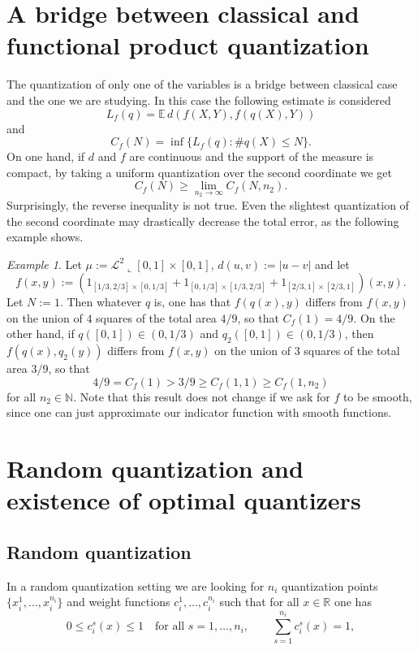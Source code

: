 \documentclass{amsart}
\theoremstyle{remark}
\newtheorem{example}[theorem]{Example}
\numberwithin{equation}{section}
\numberwithin{figure}{section}
\newcommand{\R}{\mathbb{R}}
\newcommand{\N}{\mathbb{N}}
\def\E{\mathbb{E}\,}
\newcommand{\res}{\llcorner}
\begin{document}
\section{A bridge between classical and functional product quantization}
The quantization of only one of the variables is a bridge between classical case and the one we are studying. In this case the following estimate is considered
\[
L_f(q) = \E d(f(X, Y), f(q(X), Y))
\]
and
\[
C_f(N) = \inf \{L_f(q): \#q(X) \leq N\}.
\]
On one hand, if $d$ and $f$ are continuous and the support of the measure is compact, by taking a uniform quantization over the second coordinate we get
\[
C_f(N) \geq \lim_{n_2 \to \infty} C_f(N, n_2).
\]
Surprisingly, the reverse inequality is not true. Even the slightest quantization of the second coordinate may drastically decrease the total error, as the following example shows.

\begin{example}
Let $\mu:=\mathcal{L}^2\res [0, 1] \times [0, 1]$, $d(u,v):=|u-v|$ %
and let
\[
f(x, y) := (1_{[1/3, 2/3]\times [0, 1/3]} + 1_{[0, 1/3]\times [1/3, 2/3]} + 1_{[2/3, 1]\times [2/3, 1]}) (x, y).
\]
Let $N := 1$. Then whatever $q$ is, one has that $f(q(x), y)$ differs from $f(x, y)$ on the union of $4$ squares of the total
area $4/9$, so that $C_f(1)=4/9$. On the other hand, if $q([0,1])\in (0,1/3)$ and $q_2([0,1])\in (0,1/3)$, then $f(q(x), q_2(y))$ differs from $f(x, y)$ on the union of $3$ squares of the total
area $3/9$, so that 
\[
4/9= C_f(1) > 3/9 \geq C_f(1,1)\geq C_f(1, n_2)
\] 
for all $n_2\in \N$.
Note that this result does not change if we ask for $f$ to be smooth, since one can just approximate our indicator function with smooth functions. 
\end{example}

\section{Random quantization and existence of optimal quantizers}

\subsection{Random quantization}
In a random quantization setting we are looking for $n_i$ quantization points $\{x^1_i, \ldots, x^{n_i}_i\}$ and weight functions 
$c_i^1, \ldots, c_i^{n_i}$ such that %
for all $x\in \R$ one has
\[0\leq c_i^s (x) \leq 1 \quad\mbox{for all } s=1,\ldots, n_i, \qquad  \sum_{s=1}^{n_i} c_i^s(x) = 1, \] 
\end{document}
